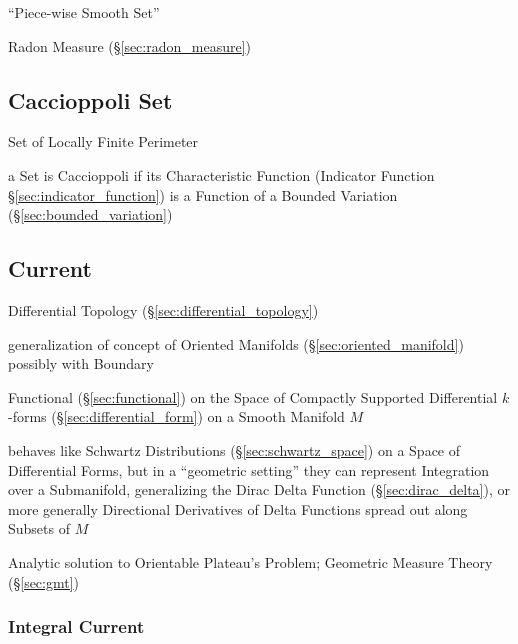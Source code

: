 ``Piece-wise Smooth Set''

Radon Measure (\S\ref{sec:radon_measure})



\subsection{Caccioppoli Set}\label{sec:caccioppoli_set}

Set of Locally Finite Perimeter

a Set is Caccioppoli if its Characteristic Function (Indicator Function
\S\ref{sec:indicator_function}) is a Function of a Bounded Variation
(\S\ref{sec:bounded_variation})



\subsection{Current}\label{sec:current}

Differential Topology (\S\ref{sec:differential_topology})

generalization of concept of Oriented Manifolds (\S\ref{sec:oriented_manifold})
possibly with Boundary

Functional (\S\ref{sec:functional}) on the Space of Compactly Supported
Differential $k$-forms (\S\ref{sec:differential_form}) on a Smooth Manifold $M$

behaves like Schwartz Distributions (\S\ref{sec:schwartz_space}) on a Space of
Differential Forms, but in a ``geometric setting'' they can represent
Integration over a Submanifold, generalizing the Dirac Delta Function
(\S\ref{sec:dirac_delta}), or more generally Directional Derivatives of Delta
Functions spread out along Subsets of $M$

\fist Analytic solution to Orientable Plateau's Problem; Geometric Measure
Theory (\S\ref{sec:gmt})




\subsubsection{Integral Current}\label{sec:integral_current}

